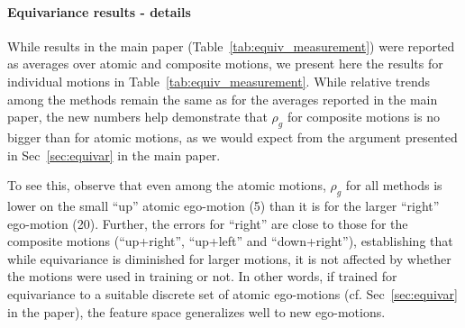 \documentclass[10pt,twocolumn,letterpaper]{article}
\begin{document}
\paragraph{Equivariance results - details}
While results in the main paper (Table~\ref{tab:equiv_measurement}) were reported as averages over atomic and composite motions, we present here the results for individual motions in Table~\ref{tab:equiv_measurement}. While relative trends among the methods remain the same as for the averages reported in the main paper, the new numbers help demonstrate that $\rho_g$ for composite motions is no bigger than for atomic motions, as we would expect from the argument presented in Sec~\ref{sec:equivar} in the main paper.

To see this, observe that even among the atomic motions, $\rho_g$ for all methods is lower on the small ``up'' atomic ego-motion (5\textdegree) than it is for the larger ``right'' ego-motion (20\textdegree). Further, the errors for ``right'' are close to those for the composite motions (``up+right'', ``up+left'' and ``down+right''), establishing that while equivariance is diminished for larger motions, it is not affected by whether the motions were used in training or not. In other words, if trained for equivariance to a suitable discrete set of atomic ego-motions (cf. Sec~\ref{sec:equivar} in the paper), the feature space generalizes well to new ego-motions.
\end{document}
